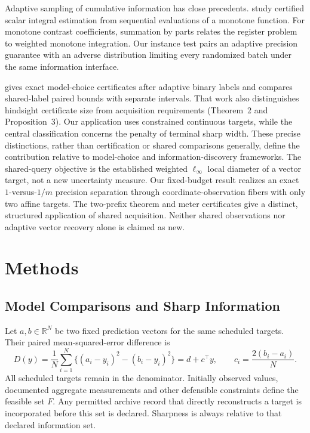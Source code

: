 \documentclass[12pt]{article}
\begin{document}
Adaptive sampling of cumulative information has close precedents.
\citet[Section~4.1.1, Corollary~1 and Theorem~3]{gaillard2023}
study certified scalar integral estimation from sequential evaluations of
a monotone function. For monotone contrast coefficients, summation by parts
relates the register problem to weighted monotone integration. Our instance
test pairs an adaptive precision guarantee with an adverse distribution
limiting every randomized batch under the same information interface.

\citet[Theorem~1 and Proposition~1]{kuboyama2026} gives exact model-choice
certificates after adaptive binary labels and compares shared-label paired
bounds with separate intervals. That work also distinguishes hindsight
certificate size from acquisition requirements (Theorem~2 and Proposition~3).
Our application uses constrained continuous targets, while the central
classification concerns the penalty of terminal sharp width. These precise
distinctions, rather than certification or shared comparisons generally,
define the contribution relative to model-choice and information-discovery
frameworks. The shared-query objective is the established weighted
$\ell_\infty$ local diameter of a vector target, not a new uncertainty measure.
Our fixed-budget result realizes an exact $1$-versus-$1/m$ precision
separation through coordinate-observation fibers with only two affine
targets. The two-prefix theorem and meter certificates give a distinct,
structured application of shared acquisition. Neither shared observations nor
adaptive vector recovery alone is claimed as new.

\section{Methods}\label{sec:methods}
\subsection{Model Comparisons and Sharp Information}
Let $a,b\in\mathbb R^N$ be two fixed prediction vectors for the same
scheduled targets. Their paired mean-squared-error difference is
\begin{equation}
 D(y)=\frac1N\sum_{i=1}^N\{(a_i-y_i)^2-(b_i-y_i)^2\}
 =d+c^\top y,\qquad c_i=\frac{2(b_i-a_i)}N.
 \label{eq:linear}
\end{equation}
All scheduled targets remain in the denominator. Initially observed values,
documented aggregate measurements and other defensible constraints define
the feasible set $F$. Any permitted archive record that directly reconstructs
a target is incorporated before this set is declared. Sharpness is always
relative to that declared information set.
\end{document}
